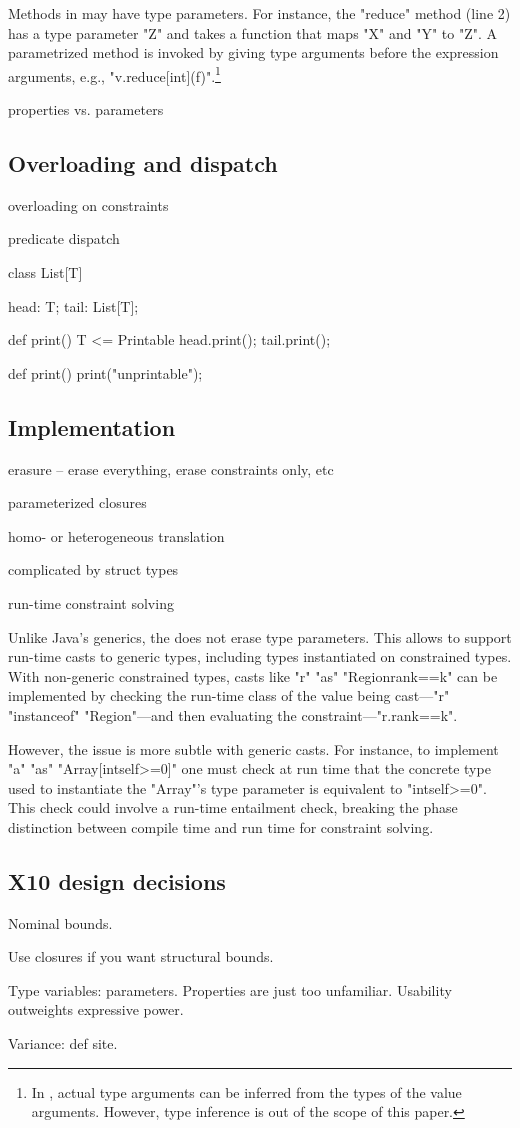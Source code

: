 Methods in \Xten may have type parameters.
For instance, the \xcd"reduce" method (line 2)
has a type parameter \xcd"Z" and takes a function that maps
\xcd"X" and \xcd"Y" to \xcd"Z".
A parametrized method is invoked by giving type arguments before the
expression arguments, e.g., \xcd"v.reduce[int](f)".\footnote{In \Xten, actual type
arguments can be inferred from the types of the value arguments.  However, type
inference is out of the scope of this paper.}






properties vs. parameters


\subsection{Overloading and dispatch}

overloading on constraints

predicate dispatch

\begin{xtennoindent}
class List[T] {
  head: T;
  tail: List[T];

  def print() {T <= Printable} {
    head.print();
    tail.print();
  }

  def print() {
    print("unprintable");
  }
}
\end{xtennoindent}

\subsection{Implementation}

erasure -- erase everything, erase constraints only, etc

parameterized closures

homo- or heterogeneous translation

        complicated by struct types

run-time constraint solving

Unlike Java's generics, the \Xten does not erase type
parameters.  This allows \Xten to support run-time casts to 
generic types, including types instantiated on constrained
types.
With
non-generic constrained types, casts like \xcd"r" \xcd"as"
\xcd"Region{rank==k}" can be implemented by
checking the run-time class of the value being cast---\xcd"r" \xcd"instanceof" \xcd"Region"---and then
evaluating the constraint---\xcd"r.rank==k".

However, the issue is more subtle with generic casts.
For instance, to implement
\xcd"a" \xcd"as" \xcd"Array[int{self>=0}]"
one must check at run time that the concrete type used to instantiate
the \xcd"Array"'s type parameter is equivalent to
\xcd"int{self>=0}".  This check could involve a run-time
entailment check, 
breaking the phase distinction between
compile time and run time for constraint solving.



\subsection{X10 design decisions}

Nominal bounds.

Use closures if you want structural bounds.

Type variables: parameters.  Properties are just too unfamiliar.
Usability outweights expressive power. 

Variance: def site.

